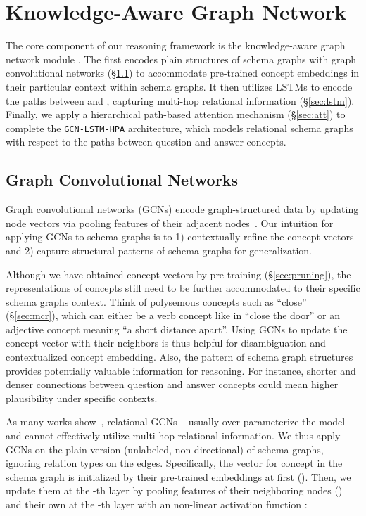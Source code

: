 \documentclass[11pt,a4paper]{article}
\newcommand{\secref}[1]{\S\ref{#1}}
\begin{document}
\section{Knowledge-Aware Graph Network}
\label{sec:kagnet}
The core component of our reasoning framework is the knowledge-aware graph network module \KagNet.
The \KagNet first encodes plain structures of schema graphs with graph convolutional networks (\secref{sec:gcn}) to accommodate pre-trained concept embeddings in their particular context within schema graphs.
It then utilizes LSTMs to encode the paths between  and , 
capturing multi-hop relational information (\secref{sec:lstm}).
Finally, we apply a hierarchical path-based attention mechanism (\secref{sec:att}) to complete the \texttt{GCN-LSTM-HPA} architecture, which models relational schema graphs with respect to the paths between question and answer concepts.
\subsection{Graph Convolutional Networks}
\label{sec:gcn}
Graph convolutional networks (GCNs) encode graph-structured data by updating node vectors via pooling features of their adjacent nodes~\cite{kipf2016semi}.
Our intuition for applying GCNs to schema graphs is to 1) contextually refine the concept vectors and 2) capture structural patterns of schema graphs for generalization.

Although we have obtained concept vectors by pre-training (\secref{sec:pruning}), 
the representations of concepts still need to be further accommodated to their specific schema graphs context.
Think of polysemous concepts such as ``close'' (\secref{sec:mcr}), which can either be a verb concept like in ``close the door'' or an adjective concept meaning ``a short distance apart''.
Using GCNs to update the concept vector with their neighbors is thus helpful for disambiguation and contextualized concept embedding. 
Also, the pattern of schema graph structures provides potentially valuable information for reasoning. 
For instance, shorter and denser connections between question and answer concepts could mean higher plausibility under specific contexts. 

As many works show~\cite{Marcheggiani2017EncodingSW,Zhang2018GraphCO}, relational GCNs ~\cite{Schlichtkrull2018ModelingRD} usually over-parameterize 
the model and cannot effectively utilize multi-hop relational information.
We thus apply GCNs on the plain version (unlabeled, non-directional) of schema graphs, ignoring relation types on the edges.
Specifically,
the vector for concept  in the schema graph  is initialized by their pre-trained embeddings at first ().
Then, we update them at the -th layer by pooling features of 
their neighboring nodes () and their own at the  -th layer 
with an non-linear activation function :
 
\end{document}
